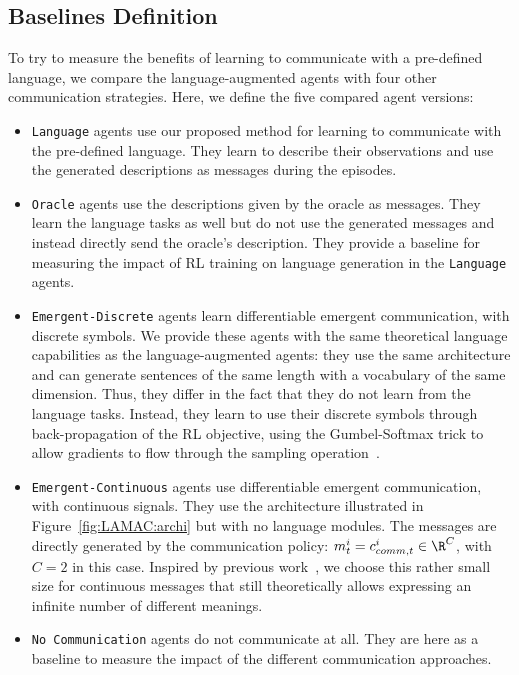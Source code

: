 \subsection{Baselines Definition}\label{sec:LAMAC:BaselineDef}

To try to measure the benefits of learning to communicate with a pre-defined language, we compare the language-augmented agents with four other communication strategies. Here, we define the five compared agent versions:
\begin{itemize}
    \item \texttt{Language} agents use our proposed method for learning to communicate with the pre-defined language. They learn to describe their observations and use the generated descriptions as messages during the episodes. 
    \item \texttt{Oracle} agents use the descriptions given by the oracle as messages. They learn the language tasks as well but do not use the generated messages and instead directly send the oracle's description. They provide a baseline for measuring the impact of RL training on language generation in the \texttt{Language} agents. 
    \item \texttt{Emergent-Discrete} agents learn differentiable emergent communication, with discrete symbols. We provide these agents with the same theoretical language capabilities as the language-augmented agents: they use the same architecture and can generate sentences of the same length with a vocabulary of the same dimension. Thus, they differ in the fact that they do not learn from the language tasks. Instead, they learn to use their discrete symbols through back-propagation of the RL objective, using the Gumbel-Softmax trick to allow gradients to flow through the sampling operation~\citep{Jang2017_GumbelSoftmax}. 
    \item \texttt{Emergent-Continuous} agents use differentiable emergent communication, with continuous signals. They use the architecture illustrated in Figure~\ref{fig:LAMAC:archi} but with no language modules. The messages are directly generated by the communication policy: $m^i_t=c_{comm,t}^i\in\R^C$, with $C=2$ in this case. Inspired by previous work~\citep{Das2019_TarMAC}, we choose this rather small size for continuous messages that still theoretically allows expressing an infinite number of different meanings. 
    \item \texttt{No Communication} agents do not communicate at all. They are here as a baseline to measure the impact of the different communication approaches.
\end{itemize}

